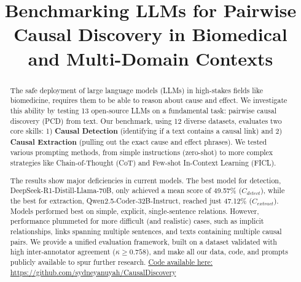 \documentclass[conference]{IEEEtran}
\begin{document}
\title{Benchmarking LLMs for Pairwise Causal Discovery in Biomedical and Multi-Domain Contexts}


\author{
}

\maketitle

\begin{abstract}
The safe deployment of large language models (LLMs) in high-stakes fields like biomedicine, requires them to be able to reason about cause and effect. We investigate this ability by testing 13 open-source LLMs on a fundamental task: pairwise causal discovery (PCD) from text. Our benchmark, using 12 diverse datasets, evaluates two core skills: 1) \textbf{Causal Detection} (identifying if a text contains a causal link) and 2) \textbf{Causal Extraction} (pulling out the exact cause and effect phrases). We tested various prompting methods, from simple instructions (zero-shot) to more complex strategies like Chain-of-Thought (CoT) and Few-shot In-Context Learning (FICL).

The results show major deficiencies in current models. The best model for detection, DeepSeek-R1-Distill-Llama-70B, only achieved a mean score of 49.57\% ($C_{detect}$), while the best for extraction, Qwen2.5-Coder-32B-Instruct, reached just 47.12\% ($C_{extract}$). Models performed best on simple, explicit, single-sentence relations. However, performance plummeted for more difficult (and realistic) cases, such as implicit relationships, links spanning multiple sentences, and texts containing multiple causal pairs. We provide a unified evaluation framework, built on a dataset validated with high inter-annotator agreement ($\kappa \ge 0.758$), and make all our data, code, and prompts publicly available to spur further research. \href{https://github.com/sydneyanuyah/CausalDiscovery}{Code available here: https://github.com/sydneyanuyah/CausalDiscovery}
\end{abstract}
\end{document}
